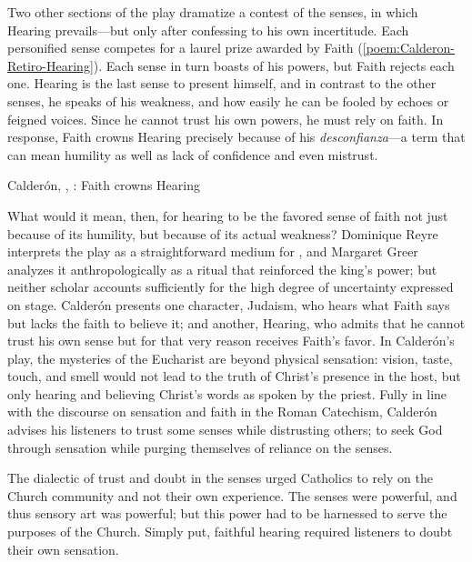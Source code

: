 Two other sections of the play dramatize a contest of the senses, in which
Hearing prevails---but only after confessing to his own incertitude.
Each personified sense competes for a laurel prize awarded by Faith
(\cref{poem:Calderon-Retiro-Hearing}).
Each sense in turn boasts of his powers, but Faith rejects each one.
Hearing is the last sense to present himself, and in contrast to the other
senses, he speaks of his weakness, and how easily he can be fooled by echoes or
feigned voices.
Since he cannot trust his own powers, he must rely on faith.
In response, Faith crowns Hearing precisely because of his
\emph{desconfianza}---a term that can mean humility as well as lack of
confidence and even mistrust.

\begin{poemexample}
    \caption{Calderón, , : Faith
    crowns Hearing}

    \label{poem:Calderon-Retiro-Hearing}
\end{poemexample}

What would it mean, then, for hearing to be the favored sense of faith not just
because of its humility, but because of its actual weakness?
Dominique Reyre interprets the play as a straightforward medium for
, and Margaret Greer analyzes it anthropologically
as a ritual that reinforced the king's power; but neither scholar accounts
sufficiently for the high degree of uncertainty expressed on stage.%
    \Autocites{Reyre:Retiro}{Greer:Retiro}
Calderón presents one character, Judaism, who hears what Faith says but lacks
the faith to believe it; and another, Hearing, who admits that he cannot trust
his own sense but for that very reason receives Faith's favor.
In Calderón's play, the mysteries of the Eucharist are beyond physical
sensation: vision,
taste, touch, and smell would not lead to the truth of Christ's presence in the
host, but only hearing and believing Christ's words  as
spoken by the priest.
Fully in line with the discourse on sensation and faith in the Roman Catechism,
Calderón advises his listeners to trust some senses while distrusting others; to
seek God through sensation while purging themselves of reliance on the senses.

The dialectic of trust and doubt in the senses urged Catholics to rely on the
Church community and not their own experience.
The senses were powerful, and thus sensory art was powerful; but this power had
to be harnessed to serve the purposes of the Church.
Simply put, faithful hearing required listeners to doubt their own sensation.

